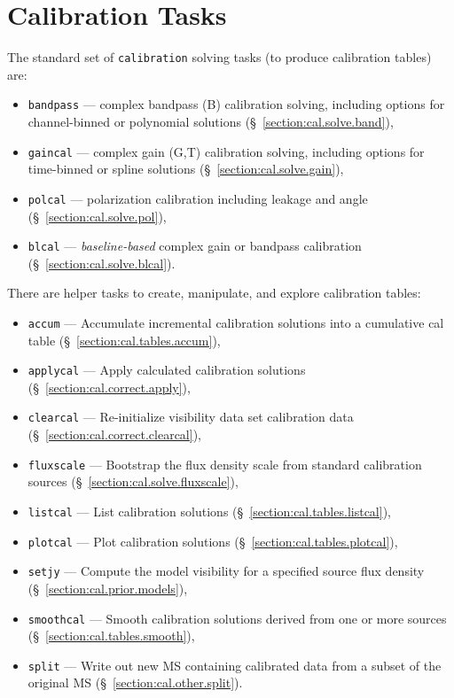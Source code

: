 \section{Calibration Tasks}
\label{section:cal.tasks}

The standard set of {\tt calibration} solving tasks (to produce
calibration tables) are:
\begin{itemize}
   \item {\tt bandpass} --- complex bandpass (B) calibration solving,
      including options for channel-binned or polynomial solutions
      (\S~\ref{section:cal.solve.band}),
   \item {\tt gaincal} --- complex gain (G,T) calibration solving, 
      including options for time-binned or spline solutions
      (\S~\ref{section:cal.solve.gain}),
   \item {\tt polcal} --- polarization calibration including leakage
      and angle
      (\S~\ref{section:cal.solve.pol}),
   \item {\tt blcal} --- {\it baseline-based} complex gain or bandpass
      calibration
      (\S~\ref{section:cal.solve.blcal}).
\end{itemize}

There are helper tasks to create, manipulate, and explore calibration 
tables:
\begin{itemize}
   \item {\tt accum} --- Accumulate incremental calibration solutions
      into a cumulative cal table (\S~\ref{section:cal.tables.accum}),
   \item {\tt applycal} --- Apply calculated calibration solutions
      (\S~\ref{section:cal.correct.apply}),
   \item {\tt clearcal} --- Re-initialize visibility data set
     calibration data (\S~\ref{section:cal.correct.clearcal}),
   \item {\tt fluxscale} --- Bootstrap the flux density scale from
      standard calibration sources (\S~\ref{section:cal.solve.fluxscale}), 
   \item {\tt listcal} --- List calibration solutions 
      (\S~\ref{section:cal.tables.listcal}),
   \item {\tt plotcal} --- Plot calibration solutions 
      (\S~\ref{section:cal.tables.plotcal}),
   \item {\tt setjy} --- Compute the model visibility for a specified
      source flux density (\S~\ref{section:cal.prior.models}),
   \item {\tt smoothcal} --- Smooth calibration solutions derived from
      one or more sources (\S~\ref{section:cal.tables.smooth}),
   \item {\tt split} --- Write out new MS containing calibrated data
      from a subset of the original MS (\S~\ref{section:cal.other.split}).
\end{itemize}

